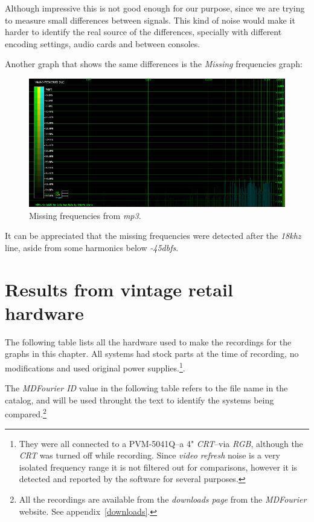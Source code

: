 \documentclass[10pt,a4paper]{report}
\newcommand{\ac}[1]{\textit{\mbox{\acrshort{#1}}}}
\newcommand{\khz}[1]{\textit{\mbox{#1\acrshort{khz}}}}
\newcommand{\db}[1]{\textit{\mbox{#1\acrshort{dbfs}}}}
\begin{document}
Although impressive this is not good enough for our purpose, since we are trying to measure small differences between signals. This kind of noise would make it harder to identify the real source of the differences, specially with different encoding settings, audio cards and between consoles.

Another graph that shows the same differences is the \textit{Missing} frequencies graph:

\begin{figure}[H]
	\centering
	\includegraphics[width=1.0\linewidth]{images/interpretation/Plot6-mp3-3.png}
	\caption[MP3 Missing]{Missing frequencies from \ac{mp3}.}
	\label{fig:plot6-mp3-3}
\end{figure}

It can be appreciated that the missing frequencies were detected after the \khz{18} line, aside from some harmonics below \db{-45}.

\chapter{Results from vintage retail hardware}
\label{results}

The following table lists all the hardware used to make the recordings for the graphs in this chapter. All systems had stock parts at the time of recording, no modifications and used original power supplies.\footnote{They were all connected to a PVM-5041Q--a 4" \textit{CRT}--via \textit{RGB}, although the \textit{CRT} was turned off while recording. Since \textit{video refresh} noise is a very isolated frequency range it is not filtered out for comparisons, however it is detected and reported by the software for several purposes.}. 

The \textit{MDFourier ID} value in the following table refers to the file name in the catalog, and will be used throught the text to identify the systems being compared.\footnote{All the recordings are available from the \textit{downloads page} from the \textit{MDFourier} website. See appendix~\ref{downloads}.}
\end{document}

